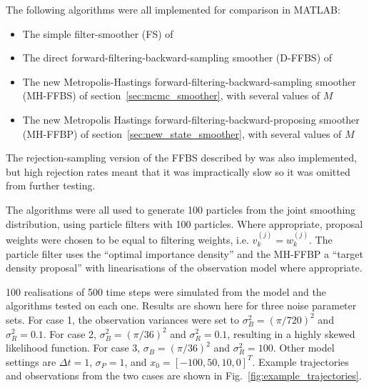 \documentclass[peerreview,11pt,draftcls,onecolumn]{IEEEtran}
\begin{document}
The following algorithms were all implemented for comparison in MATLAB:

\begin{itemize}
	\item The simple filter-smoother (FS) of \cite{Kitagawa1996}
	\item The direct forward-filtering-backward-sampling smoother (D-FFBS) of \cite{Godsill2004}
	\item The new Metropolis-Hastings forward-filtering-backward-sampling smoother (MH-FFBS) of section~\ref{sec:mcmc_smoother}, with several values of $M$
	\item The new Metropolis Hastings forward-filtering-backward-proposing smoother (MH-FFBP) of section~\ref{sec:new_state_smoother}, with several values of $M$
\end{itemize}

The rejection-sampling version of the FFBS described by \cite{Douc2009} was also implemented, but high rejection rates meant that it was impractically slow so it was omitted from further testing.

The algorithms were all used to generate 100 particles from the joint smoothing distribution, using particle filters with 100 particles. Where appropriate, proposal weights were chosen to be equal to filtering weights, i.e. $v_k^{(j)} = w_k^{(j)}$. The particle filter uses the ``optimal importance density'' and the MH-FFBP a ``target density proposal'' with linearisations of the observation model where appropriate.

100 realisations of 500 time steps were simulated from the model and the algorithms tested on each one. Results are shown here for three noise parameter sets. For case 1, the observation variances were set to $\sigma_B^2 = (\pi/720)^2$ and $\sigma_R^2 = 0.1$. For case 2, $\sigma_B^2 = (\pi/36)^2$ and $\sigma_R^2 = 0.1$, resulting in a highly skewed likelihood function. For case 3, $\sigma_B = (\pi/36)^2$ and $\sigma_R^2 = 100$. Other model settings are $\Delta t = 1$, $\sigma_P = 1$, and $x_0 = [-100, 50, 10, 0]^T$. Example trajectories and observations from the two cases are shown in Fig.~\ref{fig:example_trajectories}.
\end{document}
